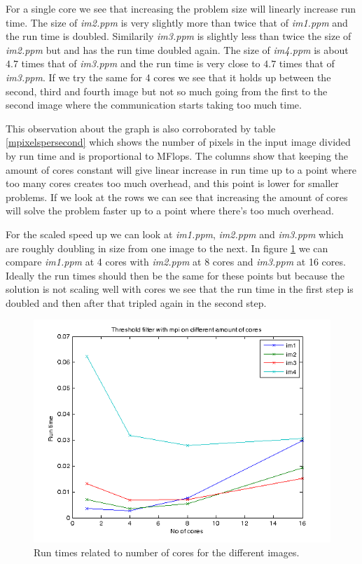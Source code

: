 \documentclass[a4paper,11pt]{article}
\begin{document}
For a single core we see that increasing the problem size will linearly increase run time. The size of \emph{im2.ppm} is very slightly more than twice that of \emph{im1.ppm} and the run time is doubled. Similarily \emph{im3.ppm} is slightly less than twice the size of \emph{im2.ppm} but and has the run time doubled again. The size of \emph{im4.ppm} is about $4.7$ times that of \emph{im3.ppm} and the run time is very close to $4.7$ times that of \emph{im3.ppm}. If we try the same for 4 cores we see that it holds up between the second, third and fourth image but not so much going from the first to the second image where the communication starts taking too much time.

This observation about the graph is also corroborated by table \ref{mpixelspersecond} which shows the number of pixels in the input image divided by run time and is proportional to MFlops. The columns show that keeping the amount of cores constant will give linear increase in run time up to a point where too many cores creates too much overhead, and this point is lower for smaller problems. If we look at the rows we can see that increasing the amount of cores will solve the problem faster up to a point where there's too much overhead.

For the scaled speed up we can look at \emph{im1.ppm}, \emph{im2.ppm} and \emph{im3.ppm} which are roughly doubling in size from one image to the next. In figure \ref{runtime_vs_cores} we can compare \emph{im1.ppm} at 4 cores with \emph{im2.ppm} at 8 cores and \emph{im3.ppm} at 16 cores. Ideally the run times should then be the same for these points but because the solution is not scaling well with cores we see that the run time in the first step is doubled and then after that tripled again in the second step.

\begin{figure}[!h]
  \caption{Run times related to number of cores for the different images.}
  \label{runtime_vs_cores}
  \includegraphics[scale=0.9]{../plots/runtimevscoresthres.png}
\end{figure}
\end{document}
